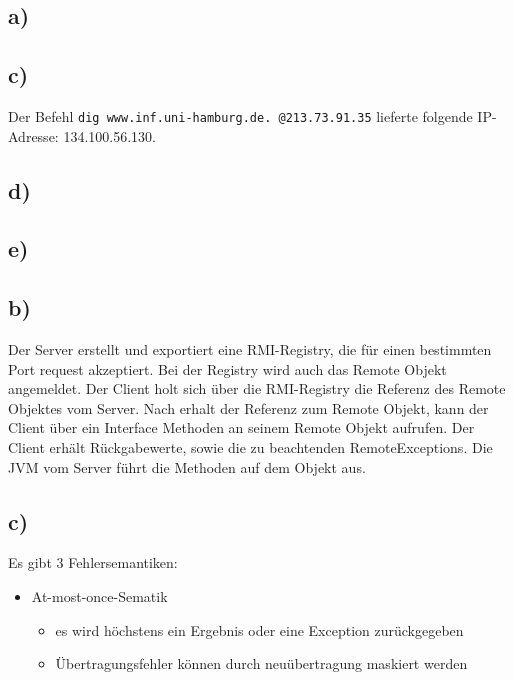 \documentclass[ngerman]{fbi-aufgabenblatt}
\begin{document}
	\setcounter{section}{0}

	
	
	\subsection*{a)}
	
	\subsection*{c)}

  Der Befehl \texttt{dig www.inf.uni-hamburg.de. @213.73.91.35}
  lieferte folgende IP-Adresse: 134.100.56.130.
  \newline

	\subsection*{d)}

	\subsection*{e)}

	
	\subsection*{b)}
  Der Server erstellt und exportiert eine RMI-Registry, die für einen bestimmten 
  Port request akzeptiert. Bei der Registry wird auch das Remote Objekt
  angemeldet.  Der Client holt sich über die RMI-Registry die Referenz des
  Remote Objektes vom Server. Nach erhalt der Referenz zum Remote Objekt,
  kann der Client über ein Interface Methoden an seinem Remote Objekt aufrufen.
  Der Client erhält Rückgabewerte, sowie die zu beachtenden RemoteExceptions.
  Die JVM vom Server führt die Methoden auf dem Objekt aus.

	\subsection*{c)}
  Es gibt 3 Fehlersemantiken:

  \begin{itemize}
    \item At-most-once-Sematik
      \begin{itemize}
        \item es wird höchstens ein Ergebnis oder eine Exception zurückgegeben
        \item Übertragungsfehler können durch neuübertragung maskiert werden
      \end{itemize}
  \end{itemize}
\end{document}

